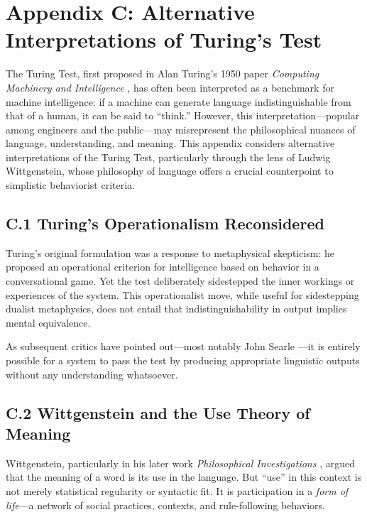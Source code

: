 \section*{Appendix C: Alternative Interpretations of Turing’s Test}

The Turing Test, first proposed in Alan Turing’s 1950 paper \textit{Computing Machinery and Intelligence} \parencite{turing1950computing}, has often been interpreted as a benchmark for machine intelligence: if a machine can generate language indistinguishable from that of a human, it can be said to “think.” However, this interpretation—popular among engineers and the public—may misrepresent the philosophical nuances of language, understanding, and meaning. This appendix considers alternative interpretations of the Turing Test, particularly through the lens of Ludwig Wittgenstein, whose philosophy of language offers a crucial counterpoint to simplistic behaviorist criteria.

\subsection*{C.1 Turing’s Operationalism Reconsidered}

Turing’s original formulation was a response to metaphysical skepticism: he proposed an operational criterion for intelligence based on behavior in a conversational game. Yet the test deliberately sidestepped the inner workings or experiences of the system. This operationalist move, while useful for sidestepping dualist metaphysics, does not entail that indistinguishability in output implies mental equivalence.

As subsequent critics have pointed out—most notably John Searle \parencite{searle1980minds}—it is entirely possible for a system to pass the test by producing appropriate linguistic outputs without any understanding whatsoever.

\subsection*{C.2 Wittgenstein and the Use Theory of Meaning}

Wittgenstein, particularly in his later work \textit{Philosophical Investigations} \parencite{wittgenstein1953philosophical}, argued that the meaning of a word is its use in the language. But “use” in this context is not merely statistical regularity or syntactic fit. It is participation in a \textit{form of life}—a network of social practices, contexts, and rule-following behaviors.

